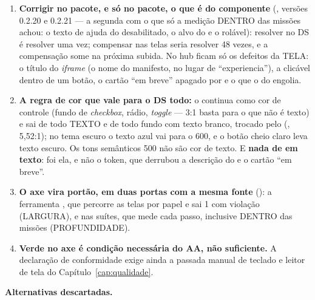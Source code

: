 \begin{enumerate}
  \item \textbf{Corrigir no pacote, e só no pacote, o que é do componente}
    (, versões 0.2.20 e 0.2.21 --- a segunda com o que só
    a medição DENTRO das missões achou: o texto de ajuda do 
    desabilitado, o alvo do  e o  rolável):
    resolver no DS é resolver uma
    vez; compensar nas telas seria resolver 48 vezes, e a compensação some na
    próxima subida. No hub ficam só os defeitos da TELA: o título do
    \emph{iframe} (o nome do manifesto, no lugar de \enquote{experiencia}),
    a  clicável dentro de um botão, o cartão \enquote{em breve} apagado
    por  e o  que o  do
     engolia.
  \item \textbf{A regra de cor que vale para o DS todo:} o 
    continua como cor de controle (fundo de \emph{checkbox}, rádio,
    \emph{toggle} --- 3:1 basta para o que não é texto) e sai de todo TEXTO e de
    todo fundo com texto branco, trocado pelo 
    (, 5,52:1); no tema escuro o texto azul vai para o 600, e o
    botão cheio claro leva texto escuro. Os tons semânticos 500 não são cor de
    texto. E \textbf{nada de  em texto}: foi ela, e não o token,
    que derrubou a descrição do  e o cartão \enquote{em
    breve}.
  \item \textbf{O axe vira portão, em duas portas com a mesma fonte}
    (): a ferramenta
    , que percorre as telas por papel
    e sai 1 com violação (LARGURA), e  nas suítes,
    que mede cada passo, inclusive DENTRO das missões (PROFUNDIDADE).
  \item \textbf{Verde no axe é condição necessária do AA, não suficiente.} A
    declaração de conformidade exige ainda a passada manual de teclado e leitor
    de tela do Capítulo~\ref{cap:qualidade}.
\end{enumerate}

\textbf{Alternativas descartadas.}

